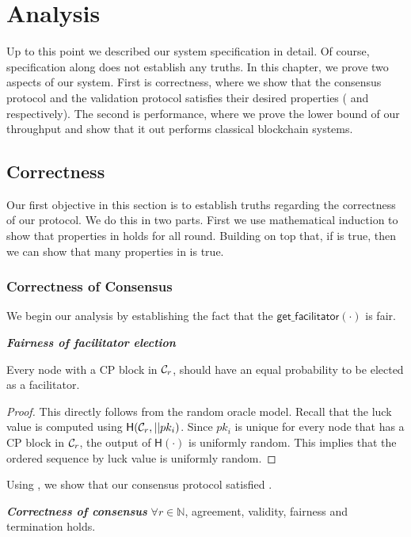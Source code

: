 \chapter{Analysis}
\label{ch:analysis}

Up to this point we described our system specification in detail.
Of course, specification along does not establish any truths.
In this chapter, we prove two aspects of our system.
First is correctness,
where we show that the consensus protocol and the validation protocol satisfies their desired properties
( and  respectively).
The second is performance,
where we prove the lower bound of our throughput and show that it out performs classical blockchain systems.

\section{Correctness}
Our first objective in this section is to establish truths regarding the correctness of our protocol.
We do this in two parts.
First we use mathematical induction to show that properties in  holds for all round.
Building on top that, if  is true, then we can show that many properties in  is true.


\subsection{Correctness of Consensus}

We begin our analysis by establishing the fact that the $\textsf{get\_facilitator}(\cdot)$ is fair.
\begin{lemma}
\label{lemma:fairness}
\textbf{\emph{Fairness of facilitator election}}

Every node with a CP block in $\mathcal{C}_r$, should have an equal probability to be elected as a facilitator.
\end{lemma}
\begin{proof}
This directly follows from the random oracle model.
Recall that the luck value is computed using $\textsf{H}(\mathcal{C}_r, || pk_i)$.
Since $pk_i$ is unique for every node that has a CP block in $\mathcal{C}_r$, the output of $\textsf{H}(\cdot)$ is uniformly random.
This implies that the ordered sequence by luck value is uniformly random.
\end{proof}


Using , we show that our consensus protocol satisfied .
\begin{lemma}
\textbf{\emph{Correctness of consensus}}
$\forall r \in \mathbb{N}$, agreement, validity, fairness and termination holds.
\end{lemma}


